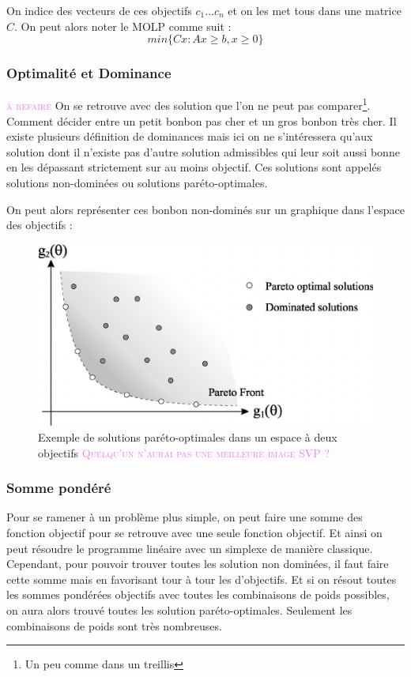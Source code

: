 \documentclass[a4paper,10pt]{article}
\newcommand{\arthur}[1]{\textcolor{violet}{\textsc{#1}}}
\theoremstyle{plain}
\begin{document}
On indice des vecteurs de ces objectifs $c_1...c_n$ et on les met tous dans une matrice $C$. On peut alors noter le MOLP comme suit : $$ min \{ Cx : Ax \geq b,x \geq 0 \} $$

\subsubsection{Optimalité et Dominance}\arthur{à refaire}
On se retrouve avec des solution que l'on ne peut pas comparer\footnote{Un peu comme dans un treillis}. Comment décider entre un petit bonbon pas cher et un gros bonbon très cher. Il existe plusieurs définition de dominances mais ici on ne s'intéressera qu'aux solution dont il n'existe pas d'autre solution admissibles qui leur soit aussi bonne en les dépassant strictement sur au moins objectif. Ces solutions sont appelés solutions non-dominées ou solutions paréto-optimales.

On peut alors représenter ces bonbon non-dominés sur un graphique dans l'espace des objectifs :

\begin{figure}[htb!]
  \centering
  \includegraphics[scale=0.6]{doc/pareto.png}
  \caption{Exemple de solutions paréto-optimales dans un espace à deux objectifs \arthur{Quelqu'un n'aurai pas une meilleure image SVP ?}}
  \label{fig:pareto}
\end{figure}

\subsubsection{Somme pondéré}
Pour se ramener à un problème plus simple, on peut faire une somme des fonction objectif pour se retrouve avec une seule fonction objectif. Et ainsi on peut résoudre le programme linéaire avec un simplexe de manière classique. Cependant, pour pouvoir trouver toutes les solution non dominées, il faut faire cette somme mais en favorisant tour à tour les d'objectifs. Et si on résout toutes les sommes pondérées objectifs avec toutes les combinaisons de poids possibles, on aura alors trouvé toutes les solution paréto-optimales. Seulement les combinaisons de poids sont très nombreuses.
\end{document}
